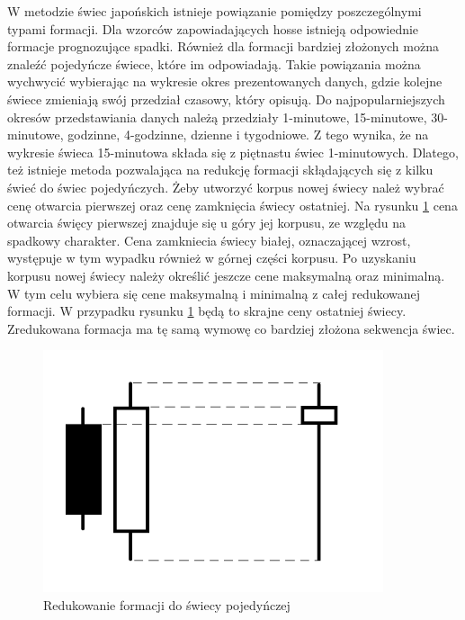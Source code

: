 \documentclass[pdflatex,11pt]{aghdpl}
\begin{document}
W metodzie świec japońskich istnieje powiązanie pomiędzy poszczególnymi typami formacji. Dla wzorców zapowiadających hosse istnieją odpowiednie formacje prognozujące spadki. Również dla formacji bardziej złożonych można znaleźć pojedyńcze świece, które im odpowiadają. Takie powiązania można wychwycić wybierając na wykresie okres prezentowanych danych, gdzie kolejne świece zmieniają swój przedział czasowy, który opisują. Do najpopularniejszych okresów przedstawiania danych należą przedziały 1-minutowe, 15-minutowe, 30-minutowe, godzinne, 4-godzinne, dzienne i tygodniowe. Z tego wynika, że na wykresie świeca 15-minutowa składa się z piętnastu świec 1-minutowych. Dlatego, też istnieje metoda pozwalająca na redukcję formacji skłądających się z kilku świeć do świec pojedyńczych. Żeby utworzyć korpus nowej świecy należ wybrać cenę otwarcia pierwszej oraz cenę zamknięcia świecy ostatniej. Na rysunku \ref{redukcja} cena otwarcia święcy pierwszej znajduje się u góry jej korpusu, ze względu na spadkowy charakter. Cena zamkniecia świecy białej, oznaczającej wzrost, występuje w tym wypadku również w górnej części korpusu. Po uzyskaniu korpusu nowej świecy należy określić jeszcze cene maksymalną oraz minimalną. W tym celu wybiera się cene maksymalną i minimalną z całej redukowanej formacji. W przypadku rysunku \ref{redukcja} będą to skrajne ceny ostatniej świecy. Zredukowana formacja ma tę samą wymowę co bardziej złożona sekwencja świec. 
\begin{figure}[ht]
\begin{center}
\includegraphics[width=10cm]{reduction.png}
\caption{Redukowanie formacji do świecy pojedyńczej}
\label{redukcja}
\end{center}
\end{figure} 
\end{document}
